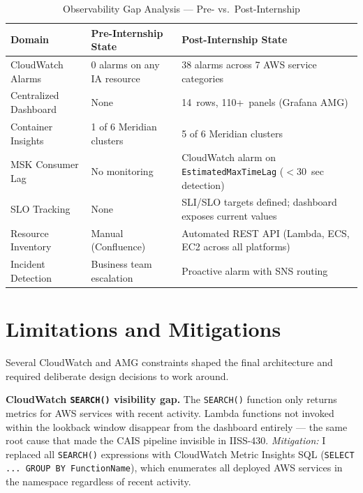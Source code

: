 \begin{table}[ht]
\centering
\caption{Observability Gap Analysis --- Pre- vs.\ Post-Internship}
\label{tab:gap_analysis}
\begin{tabular}{p{3.5cm}p{4.5cm}p{4.5cm}}
\toprule
\textbf{Domain} & \textbf{Pre-Internship State} & \textbf{Post-Internship State} \\
\midrule
CloudWatch Alarms & 0 alarms on any IA resource & 38 alarms across 7 AWS service categories \\
\midrule
Centralized Dashboard & None & 14~rows, 110+~panels (Grafana AMG) \\
\midrule
Container Insights & 1 of 6 Meridian clusters & 5 of 6 Meridian clusters \\
\midrule
MSK Consumer Lag & No monitoring & CloudWatch alarm on \texttt{EstimatedMaxTimeLag} ($<$30~sec detection) \\
\midrule
SLO Tracking & None & SLI/SLO targets defined; dashboard exposes current values \\
\midrule
Resource Inventory & Manual (Confluence) & Automated REST API (Lambda, ECS, EC2 across all platforms) \\
\midrule
Incident Detection & Business team escalation & Proactive alarm with SNS routing \\
\bottomrule
\end{tabular}
\end{table}

\section{Limitations and Mitigations}
\label{sec:limitations}

Several CloudWatch and AMG constraints shaped the final architecture and
required deliberate design decisions to work around.

\textbf{CloudWatch \texttt{SEARCH()} visibility gap.} The \texttt{SEARCH()}
function only returns metrics for AWS services with recent activity. Lambda
functions not invoked within the lookback window disappear from the
dashboard entirely --- the same root cause that made the CAIS pipeline
invisible in IISS-430. \textit{Mitigation:} I replaced all
\texttt{SEARCH()} expressions with CloudWatch Metric Insights SQL
(\texttt{SELECT ... GROUP BY FunctionName}), which enumerates all
deployed AWS services in the namespace regardless of recent activity.

